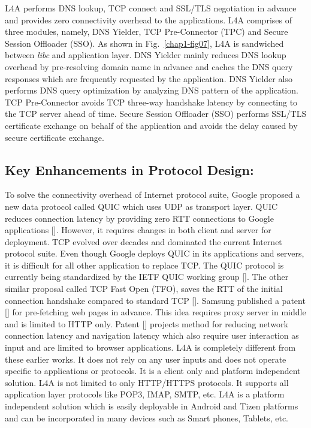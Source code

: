 \begin{multicols}{2}
{L4A performs DNS lookup, TCP connect and SSL/TLS negotiation in advance and provides zero connectivity overhead to the applications. L4A comprises of three modules, namely, DNS Yielder, TCP Pre-Connector (TPC) and Secure Session Offloader (SSO). As shown in Fig.~\ref{chap1-fig07}, L4A is sandwiched between \textit{libc} and application layer. DNS Yielder mainly reduces DNS lookup overhead by pre-resolving domain name in advance and caches the DNS query responses which are frequently requested by the application. DNS Yielder also performs DNS query optimization by analyzing DNS pattern of the application. TCP Pre-Connector avoids TCP three-way handshake latency by connecting to the TCP server ahead of time. Secure Session Offloader (SSO) performs SSL/TLS certificate exchange on behalf of the application and avoids the delay caused by secure certificate exchange.


\subsection{Key Enhancements in Protocol Design:}

To solve the connectivity overhead of Internet protocol suite, Google proposed a new data protocol called QUIC which uses UDP as transport layer. QUIC reduces connection latency by providing zero RTT connections to Google applications [\cite{art1-key18}]. However, it requires changes in both client and server for deployment. TCP evolved over decades and dominated the current Internet protocol suite. Even though Google deploys QUIC in its applications and  servers, it is difficult for all other application to replace TCP. The QUIC protocol is currently being standardized by the IETF QUIC working group [\cite{art1-key19}]. The other similar proposal called TCP Fast Open (TFO), saves the RTT of the initial connection handshake compared to standard TCP [\cite{art1-key20}]. Samsung published a patent [\cite{art1-key21}] for pre-fetching web pages in advance. This idea requires proxy server in middle and is limited to HTTP only. Patent [\cite{art1-key22}] projects method for reducing network connection latency and navigation latency which also require user interaction as input and are limited to browser applications. L4A is completely different from these earlier works. It does not rely on any user inputs and does not operate specific to applications or protocols. It is a client only and platform independent solution.  L4A is not limited to only HTTP/HTTPS protocols. It supports all application layer protocols like POP3, IMAP, SMTP, etc. L4A is a platform independent solution which is easily deployable in Android and Tizen platforms and can be incorporated in many devices such as Smart phones, Tablets, etc.

}
\end{multicols}
